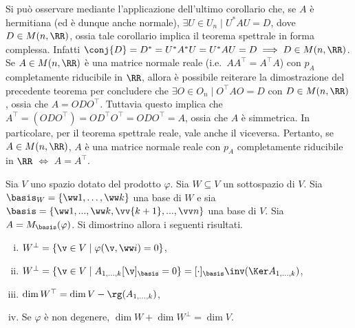 \documentclass[11pt]{article}
\begin{document}
	\begin{remark}\nl
		\li Si può osservare mediante l'applicazione dell'ultimo corollario che, se $A$ è hermitiana (ed è dunque
		anche normale),
		$\exists U \in U_n \mid U^* A U = D$, dove $D \in M(n, \RR)$, ossia tale
		corollario implica il teorema spettrale in forma complessa. Infatti
		$\conj{D} = D^* = U^* A^* U = U^* A U = D \implies D \in M(n, \RR)$. \\
		
		\li Se $A \in M(n, \RR)$ è una matrice normale reale (i.e.~$A A^\top = A^\top A$) con
		$p_A$ completamente riducibile in $\RR$, allora è possibile reiterare la dimostrazione
		del precedente teorema per concludere che $\exists O \in O_n \mid O^\top A O = D$ con
		$D \in M(n, \RR)$, ossia che $A = O D O^\top$.
		Tuttavia questo implica che $A^\top = (O D O^\top) = O D^\top O^\top = O D O^\top = A$,
		ossia che $A$ è simmetrica. In particolare, per il teorema spettrale reale, vale
		anche il viceversa. Pertanto, se $A \in M(n, \RR)$, $A$ è una matrice normale reale con $p_A$ completamente
		riducibile in $\RR$ $\iff$ $A = A^\top$.
	\end{remark}
	
	\begin{exercise}
		Sia $V$ uno spazio dotato del prodotto $\varphi$. Sia
		$W \subseteq V$ un sottospazio di $V$. Sia $\basis_W= \{ \ww 1, \ldots, \ww k \}$
		una base di $W$ e sia $\basis = \{ \ww 1, ..., \ww k, \vv{k+1}, ..., \vv n \}$ una base di $V$.
		Sia $A = M_\basis(\varphi)$. Si dimostrino allora i seguenti risultati.
		
		\begin{enumerate}[(i)]
			\item $W^\perp = \{ \v \in V \mid \varphi(\v, \ww i) = 0 \}$,
			\item $W^\perp = \{ \v \in V \mid A_{1,\ldots,k} [\v]_\basis = 0 \} = [\cdot]_\basis\inv (\Ker A_{1,\ldots,k})$,
			\item $\dim W^\top = \dim V - \rg(A_{1,\ldots,k})$,
			\item Se $\varphi$ è non degenere, $\dim W + \dim W^\perp = \dim V$.
		\end{enumerate}
	\end{exercise}
	
\end{document}
